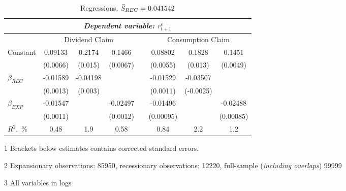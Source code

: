 \begin{table}[H]
\centering
\caption{Regressions, $\Bar{S}_{REC} = 0.041542$}  
\label{tab:regress1}
\begin{threeparttable}
\begin{tabular}{@{}lccccccc@{}}
\toprule
& \multicolumn{6}{c}{\textit{Dependent variable: $r^{e}_{t+1}$}} \\ 
\midrule
& \multicolumn{3}{c}{Dividend Claim} && \multicolumn{3}{c}{Consumption Claim} \\
\cmidrule(lr){2-4} \cmidrule(lr){6-8}
Constant & 0.09133  & 0.2174  & 0.1466  & & 0.08802 & 0.1828 & 0.1451 \\
         & (0.0066) & (0.015) & (0.0067)& &(0.0055) & (0.013)& (0.0049)\\
\addlinespace
$\beta_{REC}$ &-0.01589  & -0.04198 &&& -0.01529 & -0.03507 & \\
              & (0.0013) & (0.003)  &&& (0.0011) & (-0.0025) & \\
\addlinespace 
$\beta_{EXP}$ & -0.01547 & & -0.02497&& -0.01496 && -0.02488\\
              & (0.0011) & & (0.0012)&& (0.00095) && (0.00085)\\
\addlinespace
\midrule
$R^2$,~\%         & 0.48 & 1.9 & 0.58 & & 0.84 & 2.2 & 1.2 \\
\bottomrule
\end{tabular}
\begin{tablenotes}\footnotesize{
\item[1] Brackets below estimates contains \citet{NW87} corrected standard errors. 
\item[2] Expansionary observations: 85950, recessionary observations: 12220, full-sample (\textit{including overlaps}) 99999
\item[3] All variables in logs}
\end{tablenotes}
\end{threeparttable}
\end{table}